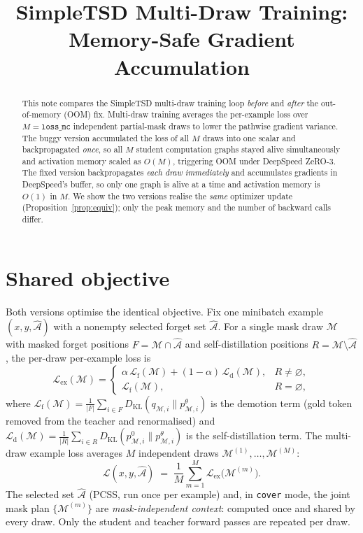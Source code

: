 \documentclass{article}
\title{SimpleTSD Multi-Draw Training:\\ Memory-Safe Gradient Accumulation}
\author{}
\date{}
\newcommand{\Ahat}{\widehat{\mathcal A}}
\newcommand{\Mset}{\mathcal M}
\newcommand{\KL}{D_{\mathrm{KL}}}
\newcommand{\Lex}{\mathcal L_{\mathrm{ex}}}
\theoremstyle{plain}
\theoremstyle{remark}
\begin{document}
\maketitle

\begin{abstract}
This note compares the SimpleTSD multi-draw training loop \emph{before} and
\emph{after} the out-of-memory (OOM) fix. Multi-draw training averages the
per-example loss over $M=\texttt{loss\_mc}$ independent partial-mask draws to
lower the pathwise gradient variance. The buggy version accumulated the loss of
all $M$ draws into one scalar and backpropagated \emph{once}, so all $M$ student
computation graphs stayed alive simultaneously and activation memory scaled as
$O(M)$, triggering OOM under DeepSpeed ZeRO-3. The fixed version backpropagates
\emph{each draw immediately} and accumulates gradients in DeepSpeed's buffer, so
only one graph is alive at a time and activation memory is $O(1)$ in $M$. We show
the two versions realise the \emph{same} optimizer update
(Proposition~\ref{prop:equiv}); only the peak memory and the number of backward
calls differ.
\end{abstract}

\section{Shared objective}

Both versions optimise the identical objective. Fix one minibatch example
$(x,y,\Ahat)$ with a nonempty selected forget set $\Ahat$. For a single mask draw
$\Mset$ with masked forget positions $F=\Mset\cap\Ahat$ and self-distillation
positions $R=\Mset\setminus\Ahat$, the per-draw per-example loss is
\begin{equation}
  \Lex(\Mset)=
  \begin{cases}
    \alpha\,\mathcal L_{\mathrm f}(\Mset)+(1-\alpha)\,\mathcal L_{\mathrm d}(\Mset), & R\neq\varnothing,\\[2pt]
    \mathcal L_{\mathrm f}(\Mset), & R=\varnothing,
  \end{cases}
  \label{eq:perdraw}
\end{equation}
where $\mathcal L_{\mathrm f}(\Mset)=\tfrac{1}{|F|}\sum_{i\in F}\KL(q_{\Mset,i}\|p^\theta_{\Mset,i})$
is the demotion term (gold token removed from the teacher and renormalised) and
$\mathcal L_{\mathrm d}(\Mset)=\tfrac{1}{|R|}\sum_{i\in R}\KL(p^0_{\Mset,i}\|p^\theta_{\Mset,i})$
is the self-distillation term. The multi-draw example loss averages $M$
independent draws $\Mset^{(1)},\ldots,\Mset^{(M)}$:
\begin{equation}
  \mathcal L(x,y,\Ahat)\;=\;\frac{1}{M}\sum_{m=1}^{M}\Lex\!\big(\Mset^{(m)}\big).
  \label{eq:mcloss}
\end{equation}
The selected set $\Ahat$ (PCSS, run once per example) and, in \texttt{cover}
mode, the joint mask plan $\{\Mset^{(m)}\}$ are \emph{mask-independent context}:
computed once and shared by every draw. Only the student and teacher forward
passes are repeated per draw.
\end{document}
